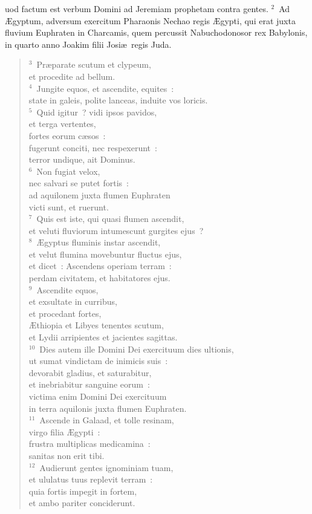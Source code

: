 \bchapter
{}uod factum est verbum Domini ad Jeremiam prophetam contra gentes.
${}^{2}$~Ad \AE gyptum, adversum exercitum Pharaonis Nechao regis \AE gypti, qui erat juxta fluvium Euphraten in Charcamis, quem percussit Nabuchodonosor rex Babylonis, in quarto anno Joakim filii Josi\ae\ regis Juda.
\begin{verse}${}^{3}$~Pr\ae parate scutum et clypeum,\\ et procedite ad bellum.\\
${}^{4}$~Jungite equos, et ascendite, equites~:\\ state in galeis, polite lanceas, induite vos loricis.\\
${}^{5}$~Quid igitur~? vidi ipsos pavidos,\\ et terga vertentes,\\ fortes eorum c\ae sos~:\\ fugerunt conciti, nec respexerunt~:\\ terror undique, ait Dominus.\\
${}^{6}$~Non fugiat velox,\\ nec salvari se putet fortis~:\\ ad aquilonem juxta flumen Euphraten\\ victi sunt, et ruerunt.\\
${}^{7}$~Quis est iste, qui quasi flumen ascendit,\\ et veluti fluviorum intumescunt gurgites ejus~?\\
${}^{8}$~\AE gyptus fluminis instar ascendit,\\ et velut flumina movebuntur fluctus ejus,\\ et dicet~: Ascendens operiam terram~:\\ perdam civitatem, et habitatores ejus.\\
${}^{9}$~Ascendite equos,\\ et exsultate in curribus,\\ et procedant fortes,\\ \AE thiopia et Libyes tenentes scutum,\\ et Lydii arripientes et jacientes sagittas.\\
${}^{10}$~Dies autem ille Domini Dei exercituum dies ultionis,\\ ut sumat vindictam de inimicis suis~:\\ devorabit gladius, et saturabitur,\\ et inebriabitur sanguine eorum~:\\ victima enim Domini Dei exercituum\\ in terra aquilonis juxta flumen Euphraten.\\
${}^{11}$~Ascende in Galaad, et tolle resinam,\\ virgo filia \AE gypti~:\\ frustra multiplicas medicamina~:\\ sanitas non erit tibi.\\
${}^{12}$~Audierunt gentes ignominiam tuam,\\ et ululatus tuus replevit terram~:\\ quia fortis impegit in fortem,\\ et ambo pariter conciderunt.\end{verse}


